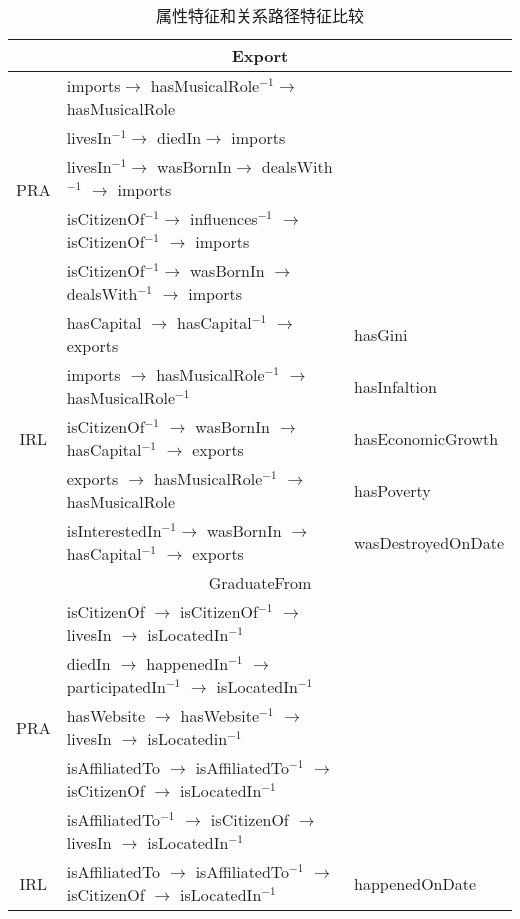 \begin{table}[htbp]
  \centering
  \caption{属性特征和关系路径特征比较}
    \begin{tabular}{cp{12.6cm}|p{3.4cm}|}
    \toprule
    \multicolumn{3}{c}{Export} \\
    \midrule
    \multirow{5}[2]{*}{PRA} & imports$\to$ hasMusicalRole$^{-1}$$\to$ hasMusicalRole &  \\
          & livesIn$^{-1}$$\to$ diedIn$\to$ imports  &  \\
          & livesIn$^{-1}$$\to$ wasBornIn$\to$ dealsWith$^{-1}$ $\to$ imports &  \\
          & isCitizenOf$^{-1}$$\to$ influences$^{-1}$ $\to$ isCitizenOf$^{-1}$ $\to$ imports &  \\
          & isCitizenOf$^{-1}$$\to$ wasBornIn $\to$ dealsWith$^{-1}$ $\to$ imports &  \\
    \midrule
    \multirow{5}[2]{*}{IRL} & hasCapital $\to$ hasCapital$^{-1}$ $\to$ exports & hasGini \\
          & imports $\to$ hasMusicalRole$^{-1}$ $\to$ hasMusicalRole$^{-1}$ & hasInfaltion \\
          & isCitizenOf$^{-1}$ $\to$ wasBornIn $\to$ hasCapital$^{-1}$ $\to$ exports & hasEconomicGrowth \\
          & exports $\to$ hasMusicalRole$^{-1}$ $\to$ hasMusicalRole & hasPoverty \\
          & isInterestedIn$^{-1}$$\to$ wasBornIn $\to$ hasCapital$^{-1}$ $\to$ exports& wasDestroyedOnDate \\
    \midrule
    \multicolumn{3}{c}{GraduateFrom} \\
    \midrule
    \multirow{5}[2]{*}{PRA} & isCitizenOf $\to$ isCitizenOf$^{-1}$ $\to$ livesIn $\to$ isLocatedIn$^{-1}$&  \\
          & diedIn $\to$ happenedIn$^{-1}$ $\to$ participatedIn$^{-1}$ $\to$ isLocatedIn$^{-1}$ &  \\
          & hasWebsite $\to$ hasWebsite$^{-1}$ $\to$ livesIn $\to$ isLocatedin$^{-1}$ &  \\
          & isAffiliatedTo $\to$ isAffiliatedTo$^{-1}$ $\to$ isCitizenOf $\to$ isLocatedIn$^{-1}$ &  \\
          & isAffiliatedTo$^{-1}$ $\to$ isCitizenOf $\to$ livesIn $\to$ isLocatedIn$^{-1}$ &  \\
    \midrule
    \multirow{5}[2]{*}{IRL} & isAffiliatedTo $\to$ isAffiliatedTo$^{-1}$ $\to$ isCitizenOf $\to$ isLocatedIn$^{-1}$& happenedOnDate\\

\end{tabular}
\end{table}
